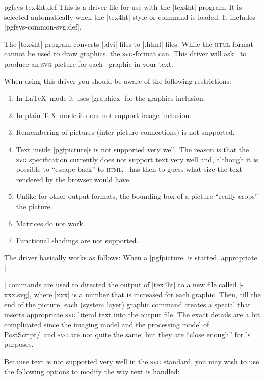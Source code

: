 \begin{filedescription}{pgfsys-tex4ht.def}
  This is a driver file for use with the |tex4ht| program. It is
  selected automatically when the |tex4ht| style or command is
  loaded. It includes |pgfsys-common-svg.def|.
  
  The |tex4ht| program converts |.dvi|-files to |.html|-files. While the
  \textsc{html}-format cannot be used to draw graphics, the
  \textsc{svg}-format can. This driver will ask
  \pgfname\ to produce an \textsc{svg}-picture for each \pgfname\
  graphic in your text.

  When using this driver you should be aware of the following
  restrictions:
  \begin{enumerate}
  \item
    In \LaTeX\ mode it uses |graphicx| for the graphics
    inclusion.
  \item
    In plain \TeX\ mode it does not support image inclusion.
  \item
    Remembering of pictures (inter-picture connections) is not
    supported.
  \item
    Text inside |pgfpicture|s is not supported very well. The reason
    is that the \textsc{svg} specification currently does not support
    text very well and, although it is  possible to ``escape
    back'' to \textsc{html}, \tikzname\ has then to guess what size the text
    rendered by the browser would have.
  \item
    Unlike for other output formats, the bounding box of a picture
    ``really crops'' the picture.
  \item
    Matrices do not work.
  \item
    Functional shadings are not supported.
  \end{enumerate}

  The driver basically works as follows: When a |{pgfpicture}| is
  started, appropriate |\special| commands are used to directed the
  output of |tex4ht| to a new file called |\jobname-xxx.svg|, where
  |xxx| is a number that is increased for each graphic. Then, till the
  end of the picture, each (system layer) graphic command creates a
  special that inserts appropriate \textsc{svg} literal text into the
  output file. The exact details are a bit complicated since the
  imaging model and the processing model of PostScript/\pdf\ and
  \textsc{svg} are not quite the same; but they are ``close enough''
  for \pgfname's purposes.

  Because text is not supported very well in the
  \textsc{svg} standard, you may wish to use the following options to
  modify the way text is handled:


\end{filedescription}
